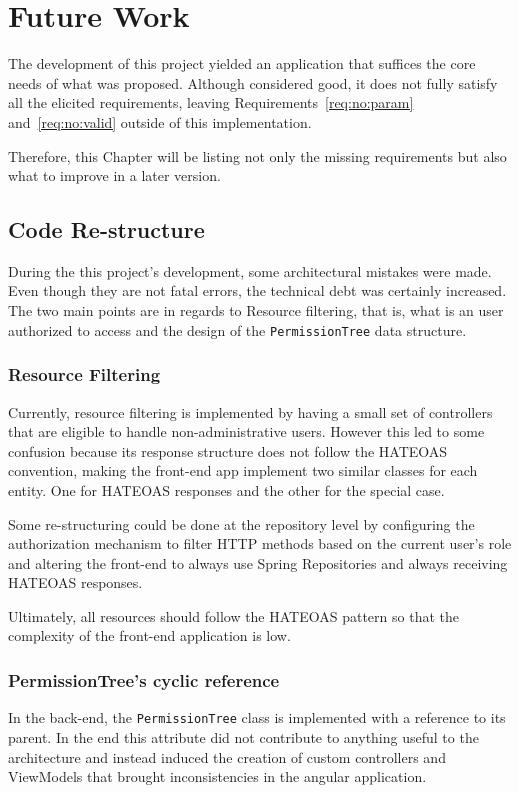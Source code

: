 \chapter{Future Work}
The development of this project yielded an application that suffices the core needs of what was proposed. Although considered good, it does not fully satisfy all the elicited requirements, leaving Requirements~\ref{req:no:param} and~\ref{req:no:valid} outside of this implementation.

Therefore, this Chapter will be listing not only the missing requirements but also what to improve in a later version.

\section{Code Re-structure}
During the this project's development, some architectural mistakes were made. Even though they are not fatal errors, the technical debt was certainly increased. The two main points are in regards to Resource filtering, that is, what is an user authorized to access and the design of the \texttt{PermissionTree} data structure. 

\subsection{Resource Filtering}
Currently, resource filtering is implemented by having a small set of controllers that are eligible to handle non-administrative users. However this led to some confusion because its response structure does not follow the \gls{HATEOAS} convention, making the front-end app implement two similar classes for each entity. One for \gls{HATEOAS} responses and the other for the special case.

Some re-structuring could be done at the repository level by configuring the authorization mechanism to filter \gls{HTTP} methods based on the current user's role and altering the front-end to always use Spring Repositories and always receiving \gls{HATEOAS} responses.

Ultimately, all resources should follow the \gls{HATEOAS} pattern so that the complexity of the front-end application is low.

\subsection{PermissionTree's cyclic reference}
In the back-end, the \texttt{PermissionTree} class is implemented with a reference to its parent. In the end this attribute did not contribute to anything useful to the architecture and instead induced the creation of custom controllers and ViewModels that brought inconsistencies in the angular application.

